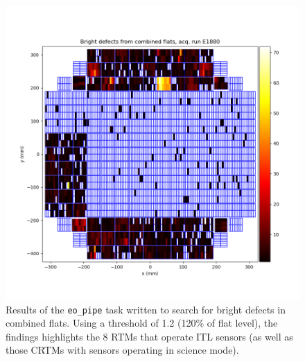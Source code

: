 \begin{figure}
    \centering
    \includegraphics[width=0.75\linewidth]{figures/vamp_desc/vampire_defects_fp_plot_LSSTCam_u_jchiang_eo_vampire_defects_E1880_w_2024_35_20241111T173034Z.png}
    \caption{Results of the {\tt eo\_pipe} task written to search for bright defects in combined flats. Using a threshold of 1.2 (120\% of flat level), the findings highlights the 8 RTMs that operate ITL sensors (as well as those CRTMs with sensors operating in science mode).}
    \label{fig:eopipe_brightdefects_task_result}
\end{figure}

%
%
%

